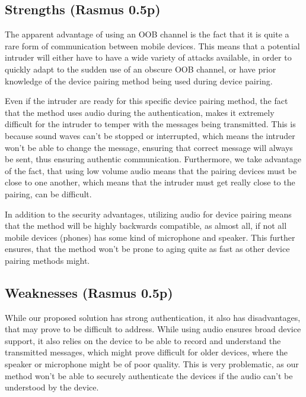 \documentclass[12pt]{article}
\begin{document}
\newpage

\subsection{Strengths (Rasmus 0.5p)}
\label{sub:Strengths}

The apparent advantage of using an OOB channel is the fact that it is quite a rare form of communication between mobile devices. This means that a potential intruder will either have to have a wide variety of attacks available, in order to quickly adapt to the sudden use of an obscure OOB channel, or have prior knowledge of the device pairing method being used during device pairing.

Even if the intruder are ready for this specific device pairing method, the fact that the method uses audio during the authentication, makes it extremely difficult for the intruder to temper with the messages being transmitted. This is because sound waves can't be stopped or interrupted, which means the intruder won't be able to change the message, ensuring that correct message will always be sent, thus ensuring authentic communication. Furthermore, we take advantage of the fact, that using low volume audio means that the pairing devices must be close to one another, which means that the intruder must get really close to the pairing, can be difficult.

In addition to the security advantages, utilizing audio for device pairing means that the method will be highly backwards compatible, as almost all, if not all mobile devices (phones) has some kind of microphone and speaker. This further ensures, that the method won't be prone to aging quite as fast as other device pairing methods might.


\subsection{Weaknesses (Rasmus 0.5p)}
\label{sub:Weaknesses}

While our proposed solution has strong authentication, it also has disadvantages, that may prove to be difficult to address. While using audio ensures broad device support, it also relies on the device to be able to record and understand the transmitted messages, which might prove difficult for older devices, where the speaker or microphone might be of poor quality. This is very problematic, as our method won't be able to securely authenticate the devices if the audio can't be understood by the device.
\end{document}

